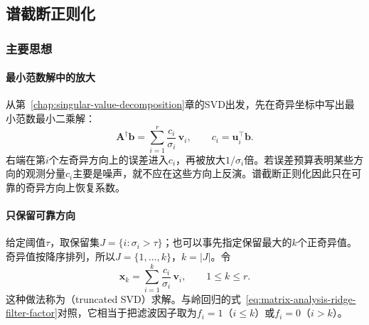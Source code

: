 \subsection{谱截断正则化}
\label{sec:ls-tsvd-solve}

\subsubsection{主要思想}

\paragraph{最小范数解中的放大}
从第~\ref{chap:singular-value-decomposition}章的SVD出发，先在奇异坐标中写出最小范数最小二乘解：
\[
 \bm A^\dagger\bm b=\sum_{i=1}^r\frac{c_i}{\sigma_i}\,\bm v_i ,\qquad c_i=\bm u_i^\top\bm b .
\]
右端在第$i$个左奇异方向上的误差进入$c_i$，再被放大$1/\sigma_i$倍。若误差预算表明某些方向的观测分量$c_i$主要是噪声，就不应在这些方向上反演。谱截断正则化因此只在可靠的奇异方向上恢复系数。

\paragraph{只保留可靠方向}
给定阈值$\tau$，取保留集$J=\{i:\sigma_i>\tau\}$；也可以事先指定保留最大的$k$个正奇异值。奇异值按降序排列，所以$J=\{1,\ldots,k\}$，$k=|J|$。令
\begin{equation}
 \bm x_k=\sum_{i=1}^k\frac{c_i}{\sigma_i}\,\bm v_i ,\qquad 1\leq k\leq r .
 \label{eq:ls-tsvd-solution}
\end{equation}
这种做法称为（truncated SVD）求解。与岭回归的式~\eqref{eq:matrix-analysis-ridge-filter-factor}对照，它相当于把滤波因子取为$f_i=1$（$i\leq k$）或$f_i=0$（$i>k$）。

